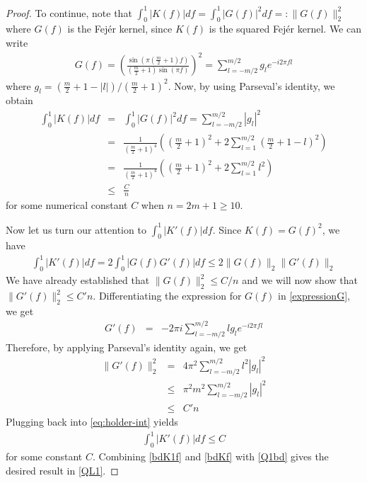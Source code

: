 \begin{subappendices}
\begin{proof}
To continue, note that $\int_0^1 | K ( f) | d  f = \int_0^1 | G ( f) |^2 d
 f =: \|G(f)\|_2^2$ where $G ( f)$ is the Fej\'er kernel, since $K(f)$ is the squared
Fej\'er kernel. We can write
\begin{eqnarray}
  G ( f)  =  \left( \frac{\sin \left( \pi \left( \frac{m}{2} + 1 \right) f
  \right)}{\left( \frac{m}{2} + 1 \right) \sin ( \pi f)} \right)^2
   =  \sum_{l = - m / 2}^{m / 2} g_l e^{- i 2 \pi f l}\label{expressionG}
\end{eqnarray}
where $g_l = \left( \frac{m}{2} + 1 - | l | \right) / \left( \frac{m}{2} + 1
\right)^2$. Now, by using Parseval's identity, we obtain
\begin{eqnarray}
 \int_0^1 |K(f)| df & = & \int_0^1 | G ( f) |^2 d f
  =  \sum_{l = - m / 2}^{m / 2} | g_l |^2\nonumber\\
  & = & \frac{1}{\left( \frac{m}{2} + 1 \right)^4} \left( \left( \frac{m}{2}
  + 1 \right)^2 + 2 \sum_{l = 1}^{m / 2} \left( \frac{m}{2} + 1 - l \right)^2
  \right)\nonumber\\
  & = & \frac{1}{\left( \frac{m}{2} + 1 \right)^4} \left( \left( \frac{m}{2}
  + 1 \right)^2 + 2 \sum_{l = 1}^{m / 2} l^2 \right)\nonumber\\
  & \leq & \frac{C}{n}\label{bdKf}
\end{eqnarray}
for some numerical constant $C$ when $n = 2 m + 1 \geq 10$.

Now let us turn our attention to $\int_0^1 | K' (
f) | d  f$. Since $K ( f) = G ( f)^2$, we have
\begin{eqnarray}
  \int_0^1 | K' ( f) | d  f  =  2\int_0^1 | G ( f) G' ( f) | d
   f
   \leq  2\| G ( f) \|_2 \| G' ( f) \|_2\label{eq:holder-int}
\end{eqnarray}
We have already established that $\| G ( f) \|_2^2 \leq C / {n}$ and we
will now show that $\| G' ( f) \|_2^2 \leq C' {n}$. Differentiating the
expression for $G(f)$ in \eqref{expressionG}, we get
\begin{eqnarray*}
  G' ( f) & = & -2 \pi i \sum_{l = - m / 2}^{m / 2} l g_l e^{- i 2 \pi f l}
\end{eqnarray*}
Therefore, by applying Parseval's identity again, we get
\begin{eqnarray*}
  \| G' ( f) \|_2^2 
  & = & 4 \pi^2 \sum_{l = - m / 2}^{m / 2} l^2 | g_l |^2\\
  & \leq &  \pi^2 m^2 \sum_{l = - m / 2}^{m / 2} | g_l |^2\\
  & \leq & C' n
\end{eqnarray*}
Plugging back into \eqref{eq:holder-int} yields
\begin{align}
\int_0^1 |K'(f)| df \leq C \label{bdK1f}
\end{align}
for some constant $C$. Combining \eqref{bdK1f} and \eqref{bdKf} with \eqref{Q1bd} gives the desired result in \eqref{QL1}.




\end{proof}
\end{subappendices}
